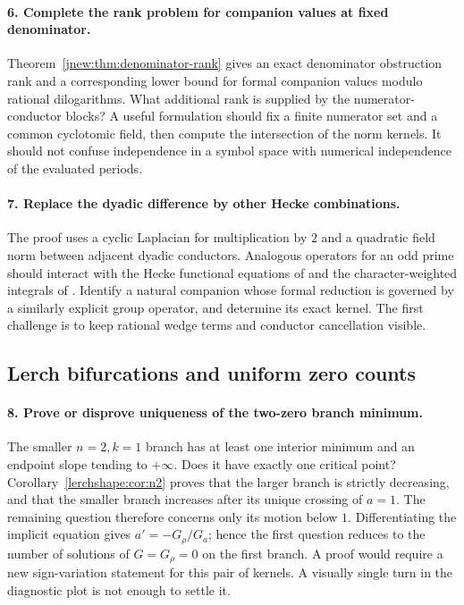 \documentclass[11pt,a4paper]{article}
\theoremstyle{definition}
\theoremstyle{remark}
\numberwithin{equation}{section}
\begin{document}
\paragraph{6. Complete the rank problem for companion values at fixed denominator.}
Theorem~\ref{jnew:thm:denominator-rank} gives an exact denominator
obstruction rank and a corresponding lower bound for formal companion
values modulo rational dilogarithms. What additional rank is supplied
by the numerator-conductor blocks? A useful formulation should fix a
finite numerator set and a common cyclotomic field, then compute the
intersection of the norm kernels. It should not confuse independence
in a symbol space with numerical independence of the evaluated periods.

\paragraph{7. Replace the dyadic difference by other Hecke combinations.}
The proof uses a cyclic Laplacian for multiplication by $2$ and a
quadratic field norm between adjacent dyadic conductors. Analogous
operators for an odd prime should interact with the Hecke functional
equations of \cite{RadchenkoZagier} and the character-weighted integrals
of \cite{DixitSathyanarayanaSharan2024}. Identify a natural companion
whose formal reduction is governed by a similarly explicit group
operator, and determine its exact kernel. The first challenge is to
keep rational wedge terms and conductor cancellation visible.

\subsection{Lerch bifurcations and uniform zero counts}

\paragraph{8. Prove or disprove uniqueness of the two-zero branch minimum.}
The smaller $n=2,k=1$ branch has at least one interior minimum and
an endpoint slope tending to $+\infty$. Does it have exactly one
critical point? Corollary~\ref{lerchshape:cor:n2} proves that the
larger branch is strictly decreasing, and that the smaller branch
increases after its unique crossing of $a=1$. The remaining question
therefore concerns only its motion below $1$. Differentiating the implicit equation gives
$a'=-G_\rho/G_a$; hence the first question reduces to the number of
solutions of $G=G_\rho=0$ on the first branch. A proof would require
a new sign-variation statement for this pair of kernels. A visually
single turn in the diagnostic plot is not enough to settle it.
\end{document}
